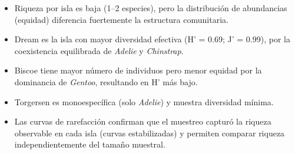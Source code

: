 \documentclass[
  spanish,
  11pt,
  a4paper,
  DIV=11,
  numbers=noendperiod]{scrartcl}
\begin{document}
\begin{itemize}
\item
  Riqueza por isla es baja (1--2 especies), pero la distribución de
  abundancias (equidad) diferencia fuertemente la estructura
  comunitaria.
\item
  Dream es la isla con mayor diversidad efectiva (H' = 0.69; J' = 0.99),
  por la coexistencia equilibrada de \emph{Adelie} y \emph{Chinstrap}.
\item
  Biscoe tiene mayor número de individuos pero menor equidad por la
  dominancia de \emph{Gentoo}, resultando en H' más bajo.
\item
  Torgersen es monoespecífica (solo \emph{Adelie}) y muestra diversidad
  mínima.
\item
  Las curvas de rarefacción confirman que el muestreo capturó la riqueza
  observable en cada isla (curvas estabilizadas) y permiten comparar
  riqueza independientemente del tamaño muestral.
\end{itemize}
\end{document}
